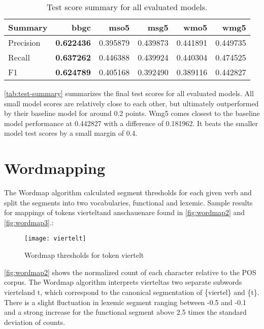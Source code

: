 \begin{table}[H]
    \centering
    \caption{Test score summary for all evaluated models.}
    \label{tab:test-summary}
    \begin{tabular}{lrrrrr}
        \toprule
        \textbf{Summary} & \textbf{bbgc} & \textbf{mso5} & \textbf{msg5} & \textbf{wmo5} & \textbf{wmg5} \\
        \midrule
        Precision & \textbf{0.622436} & 0.395879 & 0.439873 & 0.441891 & 0.449735 \\
        Recall & \textbf{0.637262} & 0.446388 & 0.439924 & 0.440304 & 0.474525 \\
        F1 & \textbf{0.624789} & 0.405168 & 0.392490 & 0.389116 & 0.442827 \\
        \bottomrule
    \end{tabular}
\end{table}

\autoref{tab:test-summary} summarizes the final test scores for all evaluated models.
All small model scores are relatively close to each other, but ultimately outperformed by their baseline model for around 0.2 points.
Wmg5 comes closest to the baseline model performance at 0.442827 with a difference of 0.181962.
It beats the smaller model test scores by a small margin of 0.4.


\section{Wordmapping}
\label{sec:wordmapping}

The Wordmap algorithm calculated segment thresholds for each given verb and split the segments into two vocabularies, functional and lexemic.
Sample results for mappings of tokens \textquotesingle viertelt\textquotesingle and \textquotesingle anschauen\textquotesingle are found in \autoref{fig:wordmap2} and \autoref{fig:wordmap3}.:

\begin{figure}[H]
    \centering
    \texttt{[image: viertelt]}
    \caption[Wordmap for \textquotesingle viertelt\textquotesingle]{Wordmap thresholds for token \textquotesingle viertelt\textquotesingle}
    \label{fig:wordmap2}
\end{figure}

\autoref{fig:wordmap2} shows the normalized count of each character relative to the POS corpus.
The Wordmap algorithm interprets \textquotesingle viertelt\textquotesingle as two separate subwords \textquotesingle viertel\textquotesingle and \textquotesingle t\textquotesingle , which correspond to the canonical segmentation of \{viertel\} and \{t\}.
There is a slight fluctuation in lexemic segment ranging between -0.5 and -0.1 and a strong increase for the functional segment above 2.5 times the standard deviation of counts.

